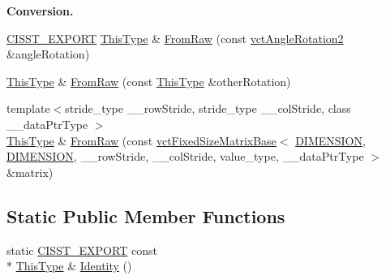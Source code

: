 \begin{Indent}{\bf Conversion.}
\begin{DoxyCompactItemize}
\item 
\hyperlink{cmn_export_macros_8h_a99393e0c3ac434b2605235bbe20684f8}{C\-I\-S\-S\-T\-\_\-\-E\-X\-P\-O\-R\-T} \hyperlink{classvct_matrix_rotation2_base_a47ffeef2ddecede4b16bcc88fb432ff5}{This\-Type} \& \hyperlink{classvct_matrix_rotation2_base_addfc34ad79a9503f6984c8c764aaad91}{From\-Raw} (const \hyperlink{classvct_angle_rotation2}{vct\-Angle\-Rotation2} \&angle\-Rotation)
\item 
\hyperlink{classvct_matrix_rotation2_base_a47ffeef2ddecede4b16bcc88fb432ff5}{This\-Type} \& \hyperlink{classvct_matrix_rotation2_base_ab24150ad52091b8bd75d440c43081dd7}{From\-Raw} (const \hyperlink{classvct_matrix_rotation2_base_a47ffeef2ddecede4b16bcc88fb432ff5}{This\-Type} \&other\-Rotation)
\item 
{\footnotesize template$<$stride\-\_\-type \-\_\-\-\_\-row\-Stride, stride\-\_\-type \-\_\-\-\_\-col\-Stride, class \-\_\-\-\_\-data\-Ptr\-Type $>$ }\\\hyperlink{classvct_matrix_rotation2_base_a47ffeef2ddecede4b16bcc88fb432ff5}{This\-Type} \& \hyperlink{classvct_matrix_rotation2_base_a6b853f8c82b91e33ec94dbd29b46d513}{From\-Raw} (const \hyperlink{classvct_fixed_size_matrix_base}{vct\-Fixed\-Size\-Matrix\-Base}$<$ \hyperlink{classvct_matrix_rotation2_base_ac10279ed12ec787b1a4833ea02771348acefb9855f54f0cfd782e785c9083e592}{D\-I\-M\-E\-N\-S\-I\-O\-N}, \hyperlink{classvct_matrix_rotation2_base_ac10279ed12ec787b1a4833ea02771348acefb9855f54f0cfd782e785c9083e592}{D\-I\-M\-E\-N\-S\-I\-O\-N}, \-\_\-\-\_\-row\-Stride, \-\_\-\-\_\-col\-Stride, value\-\_\-type, \-\_\-\-\_\-data\-Ptr\-Type $>$ \&matrix)
\end{DoxyCompactItemize}
\end{Indent}
\subsection*{Static Public Member Functions}
\begin{DoxyCompactItemize}
\item 
static \hyperlink{cmn_export_macros_8h_a99393e0c3ac434b2605235bbe20684f8}{C\-I\-S\-S\-T\-\_\-\-E\-X\-P\-O\-R\-T} const \\*
\hyperlink{classvct_matrix_rotation2_base_a47ffeef2ddecede4b16bcc88fb432ff5}{This\-Type} \& \hyperlink{classvct_matrix_rotation2_base_a83a8b1301a602f4aeef176c02d89e61e}{Identity} ()
\end{DoxyCompactItemize}
